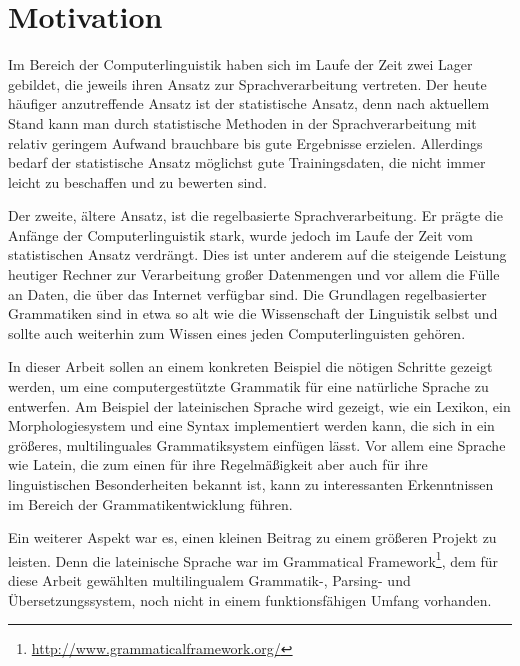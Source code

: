 \section{Motivation}
\label{sec:motivation}
Im Bereich der Computerlinguistik haben sich im Laufe der Zeit zwei Lager gebildet, die jeweils ihren Ansatz zur Sprachverarbeitung vertreten. Der heute häufiger anzutreffende Ansatz ist der statistische Ansatz, denn nach aktuellem Stand kann man durch statistische Methoden in der Sprachverarbeitung mit relativ geringem Aufwand brauchbare bis gute Ergebnisse erzielen. Allerdings bedarf der statistische Ansatz möglichst gute Trainingsdaten, die nicht immer leicht zu beschaffen und zu bewerten sind. \par
Der zweite, ältere Ansatz, ist die regelbasierte Sprachverarbeitung. Er prägte die Anfänge der Computerlinguistik stark, wurde jedoch im Laufe der Zeit vom statistischen Ansatz verdrängt. Dies ist unter anderem auf die steigende Leistung heutiger Rechner zur Verarbeitung großer Datenmengen und vor allem die Fülle an Daten, die über das Internet verfügbar sind. Die Grundlagen regelbasierter Grammatiken sind in etwa so alt wie die Wissenschaft der Linguistik selbst und sollte auch weiterhin zum Wissen eines jeden Computerlinguisten gehören. \par
In dieser Arbeit sollen an einem konkreten Beispiel die nötigen Schritte gezeigt werden, um eine computergestützte Grammatik für eine natürliche Sprache zu entwerfen. Am Beispiel der lateinischen Sprache wird gezeigt, wie ein Lexikon, ein Morphologiesystem und eine Syntax implementiert werden kann, die sich in ein größeres, multilinguales Grammatiksystem einfügen lässt. Vor allem eine Sprache wie Latein, die zum einen für ihre Regelmäßigkeit aber auch für ihre linguistischen Besonderheiten bekannt ist, kann zu interessanten Erkenntnissen im Bereich der Grammatikentwicklung führen. \par
Ein weiterer Aspekt war es, einen kleinen Beitrag zu einem größeren Projekt zu leisten. Denn die lateinische Sprache war im Grammatical Framework\footnote{\url{http://www.grammaticalframework.org/}}, dem für diese Arbeit gewählten multilingualem Grammatik-, Parsing- und Übersetzungssystem, noch nicht in einem funktionsfähigen Umfang vorhanden.
\pagebreak
